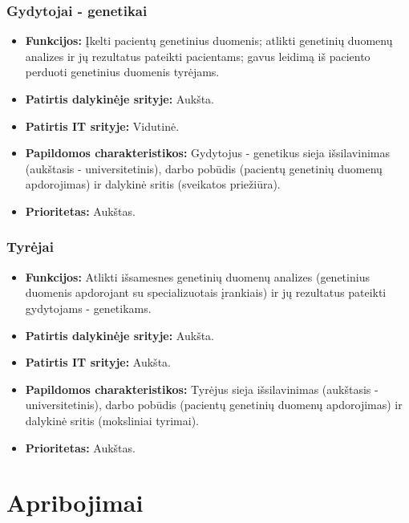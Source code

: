 \documentclass[12pt]{article}
\begin{document}
\subsubsection*{Gydytojai - genetikai}
\begin{itemize}
    \item \textbf{Funkcijos:} Įkelti pacientų genetinius duomenis; atlikti
    genetinių duomenų analizes ir jų rezultatus pateikti pacientams; gavus
    leidimą iš paciento perduoti genetinius duomenis tyrėjams. %
    \item \textbf{Patirtis dalykinėje srityje:} Aukšta.
    \item \textbf{Patirtis IT srityje:} Vidutinė.
    \item \textbf{Papildomos charakteristikos:} Gydytojus - genetikus sieja
    išsilavinimas (aukštasis - universitetinis), darbo pobūdis (pacientų
    genetinių duomenų apdorojimas) ir dalykinė sritis (sveikatos priežiūra).
    \item \textbf{Prioritetas:} Aukštas.
\end{itemize}

\subsubsection*{Tyrėjai}
\begin{itemize}
    \item \textbf{Funkcijos:} Atlikti išsamesnes genetinių duomenų analizes
    (genetinius duomenis apdorojant su specializuotais įrankiais) ir jų
    rezultatus pateikti gydytojams - genetikams.
    \item \textbf{Patirtis dalykinėje srityje:} Aukšta.
    \item \textbf{Patirtis IT srityje:} Aukšta.
    \item \textbf{Papildomos charakteristikos:} Tyrėjus sieja išsilavinimas 
    (aukštasis - universitetinis), darbo pobūdis (pacientų genetinių duomenų
    apdorojimas) ir dalykinė sritis (moksliniai tyrimai).
    \item \textbf{Prioritetas:} Aukštas.
\end{itemize}

\newpage

\section{Apribojimai}
\end{document}
